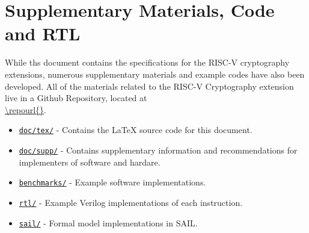 
\newpage
\section{Supplementary Materials, Code and RTL}

While ths document contains the specifications for the RISC-V cryptography
extensions, numerous supplementary materials and example codes have
also been developed.
All of the materials related to the RISC-V Cryptography
extension live in a Github Repository, located at\\
\url{\repourl{}}.

\begin{itemize}
\item\href{\repourl{tree/master/doc}}{\tt doc/tex/}
- Contains the \LaTeX\xspace source code for this document.

\item\href{\repourl{tree/master/doc/supp/supplementary-info.adoc}}{\tt doc/supp/}
- Contains supplementary information and recommendations for implementers of
software and hardare.

\item\href{\repourl{tree/master/benchmarks}}{\tt benchmarks/}
- Example software implementations.

\item\href{\repourl{tree/master/rtl}}{\tt rtl/}
- Example Verilog implementations of each instruction.

\item\href{\repourl{tree/dev/next-release/sail}}{\tt sail/}
- Formal model implementations in SAIL.
\end{itemize}
